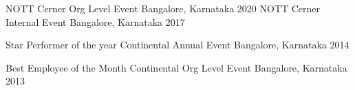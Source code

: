 



\begin{cvhonors}

  \cvhonor
    {NOTT} %
    {Cerner Org Level Event} %
    {Bangalore, Karnataka} %
    {2020} %
  \cvhonor
    {NOTT} %
    {Cerner Internal Event} %
    {Bangalore, Karnataka} %
    {2017} %

  \cvhonor
    {Star Performer of the year} %
    {Continental Annual Event} %
    {Bangalore, Karnataka} %
    {2014} %

  \cvhonor
    {Best Employee of the Month } %
    {Continental Org Level Event} %
    {Bangalore, Karnataka} %
    {2013} %

\end{cvhonors}

